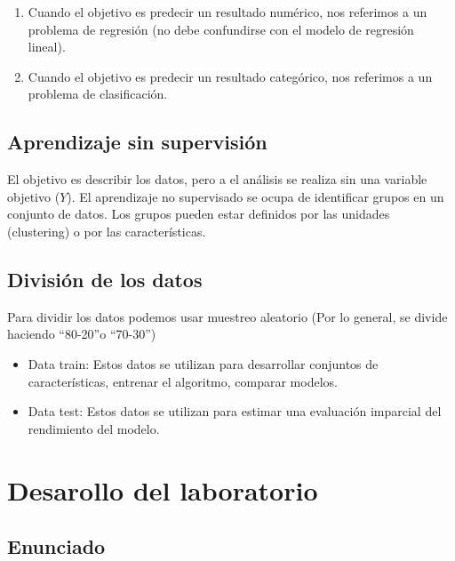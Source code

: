 \documentclass[
]{article}
\providecommand{\tightlist}{%
  \setlength{\itemsep}{0pt}\setlength{\parskip}{0pt}}
\begin{document}
\begin{enumerate}
\def\labelenumi{\alph{enumi})}
\tightlist
\item
  Cuando el objetivo es predecir un resultado numérico, nos referimos a
  un problema de regresión (no debe confundirse con el modelo de
  regresión lineal).
\item
  Cuando el objetivo es predecir un resultado categórico, nos referimos
  a un problema de clasificación.
\end{enumerate}

\hypertarget{aprendizaje-sin-supervisiuxf3n}{%
\subsection{Aprendizaje sin
supervisión}\label{aprendizaje-sin-supervisiuxf3n}}

El objetivo es describir los datos, pero a el análisis se realiza sin
una variable objetivo (\(Y\)). El aprendizaje no supervisado se ocupa de
identificar grupos en un conjunto de datos. Los grupos pueden estar
definidos por las unidades (clustering) o por las características.

\hypertarget{divisiuxf3n-de-los-datos}{%
\subsection{División de los datos}\label{divisiuxf3n-de-los-datos}}

Para dividir los datos podemos usar muestreo aleatorio (Por lo general,
se divide haciendo ``80-20''o ``70-30'')

\begin{itemize}
\item
  Data train: Estos datos se utilizan para desarrollar conjuntos de
  características, entrenar el algoritmo, comparar modelos.
\item
  Data test: Estos datos se utilizan para estimar una evaluación
  imparcial del rendimiento del modelo.
\end{itemize}

\hypertarget{desarollo-del-laboratorio}{%
\section{Desarollo del laboratorio}\label{desarollo-del-laboratorio}}

\hypertarget{enunciado}{%
\subsection{Enunciado}\label{enunciado}}
\end{document}
